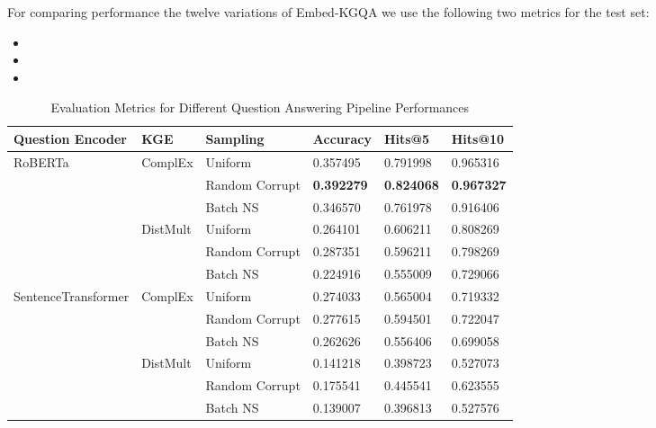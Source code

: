 \documentclass{article}
\begin{document}
For comparing performance the twelve variations of Embed-KGQA we use the following two metrics for the test set:
\begin{itemize}
    \item {}
    \item {}
    \item {}
\end{itemize}
\sloppy
\begin{table}[htbp]
\centering
\footnotesize %
\caption{Evaluation Metrics for Different Question Answering Pipeline Performances}
\label{tab:evaluation_metrics1}
\begin{tabular}{@{}llllll@{}}
\toprule
Question Encoder & KGE & Sampling & Accuracy & Hits@5 & Hits@10 \\
\midrule
\multirow{6}{*}{RoBERTa} & \multirow{3}{*}{ComplEx} & Uniform & 0.357495 & 0.791998  & 0.965316\\
                         &                          & Random Corrupt & \textbf{0.392279} & \textbf{0.824068} & \textbf{0.967327}\\
                         &                          & Batch NS & 0.346570 & 0.761978  & 0.916406\\
\cline{2-6} %
                         & \multirow{3}{*}{DistMult} & Uniform &  0.264101 & 0.606211 & 0.808269\\ 
                         &                          & Random Corrupt &  0.287351 & 0.596211 & 0.798269\\ 
                         &                          & Batch NS & 0.224916 & 0.555009 & 0.729066\\
\midrule
\multirow{6}{*}{SentenceTransformer} & \multirow{3}{*}{ComplEx} & Uniform & 0.274033 & 0.565004& 0.719332\\
                         &                          & Random Corrupt & 0.277615 & 0.594501 & 0.722047\\
                         &                          & Batch NS & 0.262626 & 0.556406 & 0.699058\\
\cline{2-6} %
                         & \multirow{3}{*}{DistMult} & Uniform & 0.141218&0.398723&0.527073\\
                         &                          & Random Corrupt  & 0.175541&0.445541&0.623555\\
                         &                          & Batch NS & 0.139007 & 0.396813& 0.527576\\
\bottomrule
\end{tabular}
\end{table}
\sloppy
\end{document}
